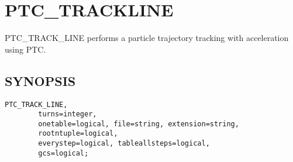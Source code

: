 
\chapter{PTC\_TRACKLINE}

PTC\_TRACK\_LINE performs a particle trajectory tracking with
acceleration using PTC.

\section{SYNOPSIS}

\begin{verbatim}
PTC_TRACK_LINE, 
        turns=integer, 
        onetable=logical, file=string, extension=string,
        rootntuple=logical,
        everystep=logical, tableallsteps=logical, 
        gcs=logical;
\end{verbatim}



